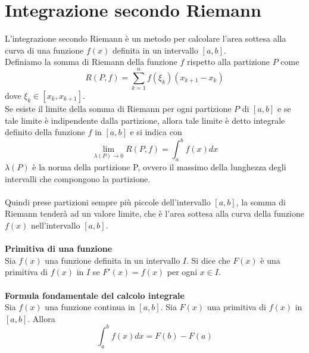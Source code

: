 \documentclass{article}
\begin{document}
\section*{Integrazione secondo Riemann}
L'integrazione secondo Riemann è un metodo per calcolare l'area sottesa alla curva di una funzione $f(x)$ definita in un intervallo $[a,b]$.\\
Definiamo la somma di Riemann della funzione $f$ rispetto alla partizione $P$ come
\begin{equation*}
    R(P,f) = \sum_{k=1}^n f(\xi_k)(x_{k+1}-x_k)
\end{equation*}
dove $\xi_k \in [x_k,x_{k+1}]$.\\
Se esiste il limite della somma di Riemann per ogni partizione $P$ di $[a,b]$ e se tale limite è indipendente dalla partizione, allora tale limite è detto integrale definito della funzione $f$ in $[a,b]$ e si indica con
\begin{equation*}
    \lim_{\lambda(P) \to 0} R(P,f) = \int_a^b f(x)dx
\end{equation*}
$\lambda(P)$ è la norma della partizione P, ovvero il massimo della lunghezza degli intervalli che compongono la partizione.\\\\
Quindi prese partizioni sempre più piccole dell'intervallo $[a,b]$, la somma di Riemann tenderà ad un valore limite, che è l'area sottesa alla curva della funzione $f(x)$ nell'intervallo $[a,b]$.\\\\

\textbf{Primitiva di una funzione}\\
Sia $f(x)$ una funzione definita in un intervallo $I$. Si dice che $F(x)$ è una primitiva di $f(x)$ in $I$ se $F'(x)=f(x)$ per ogni $x \in I$.\\\\
\textbf{Formula fondamentale del calcolo integrale}\\
Sia $f(x)$ una funzione continua in $[a,b]$. Sia $F(x)$ una primitiva di $f(x)$ in $[a,b]$. Allora
\begin{equation*}
    \int_a^b f(x)dx = F(b)-F(a)
\end{equation*}
\end{document}
